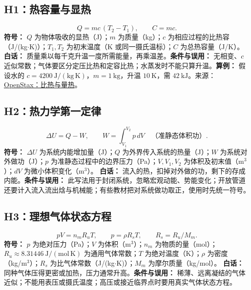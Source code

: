 \subsection{H1：热容量与显热}
\begin{equation}
Q=mc\,(T_2-T_1),\qquad C=mc.
\end{equation}
\textbf{符号：} $Q$ 为物体吸收的显热（J）；$m$ 为质量（kg）；$c$ 为相应过程的比热容（J/(kg$\cdot$K)）；$T_1,T_2$ 为初末温度（K 或同一摄氏温标）；$C$ 为总热容量（J/K）。
\textbf{白话：} 质量乘以每千克升温一度所需能量，再乘温差。\textbf{条件与误用：} 无相变、$c$ 近似常数；气体要区分定压比热和定容比热；水蒸发时不能只算升温。\textbf{算例：} 假设水的 $c=4200\ \mathrm{J/(kg\,K)}$，$m=1\ \mathrm{kg}$，升温 $10\ \mathrm K$，需 $42\ \mathrm{kJ}$。来源：\href{https://openstax.org/books/university-physics-volume-2/pages/1-4-heat-transfer-specific-heat-and-calorimetry}{OpenStax：比热与量热}。

\subsection{H2：热力学第一定律}
\begin{equation}
\Delta U=Q-W,\qquad W=\int_{V_1}^{V_2}p\,dV\quad\text{（准静态体积功）}.
\end{equation}
\textbf{符号：} $\Delta U$ 为系统内能增加量（J）；$Q$ 为外界传入系统的热量（J）；$W$ 为系统对外做功（J）；$p$ 为准静态过程中的边界压力（Pa）；$V,V_1,V_2$ 为体积及初末值（m$^3$）；$dV$ 为微小体积变化（m$^3$）。
\textbf{白话：} 流入的热，扣掉对外做的功，剩下的存成内能。\textbf{条件与误用：} 此写法用于封闭系统，忽略宏观动能、势能变化；开放管道还要计入流入流出焓与机械能；有些教材把对系统做功取正，使用时先统一符号。

\subsection{H3：理想气体状态方程}
\begin{equation}
pV=n_mR_uT,\qquad p=\rho R_sT,\qquad R_s=R_u/M_m.
\end{equation}
\textbf{符号：} $p$ 为绝对压力（Pa）；$V$ 为体积（m$^3$）；$n_m$ 为物质的量（mol）；$R_u\approx8.31446\ \mathrm{J/(mol\,K)}$ 为通用气体常数；$T$ 为绝对温度（K）；$\rho$ 为密度（kg/m$^3$）；$R_s$ 为比气体常数（J/(kg$\cdot$K)）；$M_m$ 为摩尔质量（kg/mol）。
\textbf{白话：} 同种气体压得更密或加热，压力通常升高。\textbf{条件与误用：} 稀薄、远离凝结的气体近似；不能用表压或摄氏温度；高压或接近临界点时要用真实气体状态方程。

